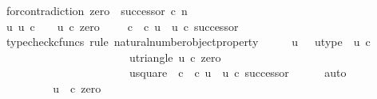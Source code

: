 \begin{isabellebody}
\ for{\isacharunderscore}{\kern0pt}contradiction{\isacharcolon}{\kern0pt}\ {\isachardoublequoteopen}zero\ {\isacharequal}{\kern0pt}\ successor\ {\isasymcirc}\isactrlsub c\ n{\isachardoublequoteclose}\isanewline
\ \ \isamarkupfalse%
\ {\isachardoublequoteopen}{\isasymexists}{\isacharbang}{\kern0pt}u{\isachardot}{\kern0pt}\ u{\isacharcolon}{\kern0pt}\ {\isasymnat}\isactrlsub c\ {\isasymrightarrow}\ {\isasymOmega}\ {\isasymand}\ u\ {\isasymcirc}\isactrlsub c\ zero\ {\isacharequal}{\kern0pt}\ {\isasymt}\ {\isasymand}\ {\isacharparenleft}{\kern0pt}{\isasymf}\ {\isasymcirc}\isactrlsub c\ {\isasymbeta}\isactrlbsub {\isasymOmega}\isactrlesub {\isacharparenright}{\kern0pt}\ {\isasymcirc}\isactrlsub c\ u\ {\isacharequal}{\kern0pt}\ u\ {\isasymcirc}\isactrlsub c\ successor{\isachardoublequoteclose}\isanewline
\ \ \ \ \isamarkupfalse%
\ {\isacharparenleft}{\kern0pt}typecheck{\isacharunderscore}{\kern0pt}cfuncs{\isacharcomma}{\kern0pt}\ rule\ natural{\isacharunderscore}{\kern0pt}number{\isacharunderscore}{\kern0pt}object{\isacharunderscore}{\kern0pt}property{}{\isacharparenright}{\kern0pt}\isanewline
\ \ \isamarkupfalse%
\ \isamarkupfalse%
\ u\ \ \ u{\isacharunderscore}{\kern0pt}type{\isacharcolon}{\kern0pt}\ \ {\isachardoublequoteopen}u{\isacharcolon}{\kern0pt}\ {\isasymnat}\isactrlsub c\ {\isasymrightarrow}\ {\isasymOmega}{\isachardoublequoteclose}\ \ \isanewline
\ \ \ \ \ \ \ \ \ \ \ \ \ \ \ \ \ \ \ \ \ \ \ u{\isacharunderscore}{\kern0pt}triangle{\isacharcolon}{\kern0pt}\ {\isachardoublequoteopen}u\ {\isasymcirc}\isactrlsub c\ zero\ {\isacharequal}{\kern0pt}\ {\isasymt}{\isachardoublequoteclose}\ \ \ \isanewline
\ \ \ \ \ \ \ \ \ \ \ \ \ \ \ \ \ \ \ \ \ \ \ u{\isacharunderscore}{\kern0pt}square{\isacharcolon}{\kern0pt}\ {\isachardoublequoteopen}{\isacharparenleft}{\kern0pt}{\isasymf}\ {\isasymcirc}\isactrlsub c\ {\isasymbeta}\isactrlbsub {\isasymOmega}\isactrlesub {\isacharparenright}{\kern0pt}\ {\isasymcirc}\isactrlsub c\ u\ {\isacharequal}{\kern0pt}\ u\ {\isasymcirc}\isactrlsub c\ successor{\isachardoublequoteclose}\isanewline
\ \ \ \ \isamarkupfalse%
\ auto\isanewline
\ \ \isamarkupfalse%
\ {\isachardoublequoteopen}{\isasymt}\ {\isacharequal}{\kern0pt}\ {\isasymf}{\isachardoublequoteclose}\ \isanewline
\ \ \isamarkupfalse%
\ {\isacharminus}{\kern0pt}\isanewline
\ \ \ \ \isamarkupfalse%
\ {\isachardoublequoteopen}{\isasymt}\ {\isacharequal}{\kern0pt}\ u\ \ {\isasymcirc}\isactrlsub c\ zero{\isachardoublequoteclose}\isanewline

\end{isabellebody}
